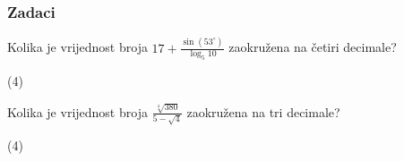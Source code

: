 \newpage

\subsubsection{Zadaci}

\begin{zadatak}
    Kolika je vrijednost broja $\displaystyle 17 + \frac{\sin (53^{\circ})}{\log_5 10}$ zaokružena na četiri decimale?
    \begin{tasks}(4)
	\end{tasks}
\end{zadatak}

\begin{zadatak}
    Kolika je vrijednost broja $\displaystyle \frac{\sqrt[4]{380}}{5-\sqrt {4}}$ zaokružena na tri decimale?
    \begin{tasks}(4)
	\end{tasks}
\end{zadatak}

\newpage